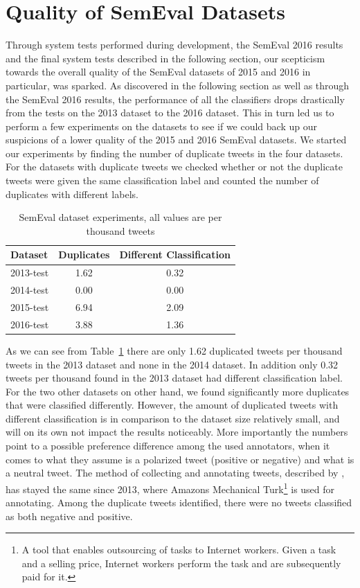 \section{Quality of SemEval Datasets}
\label{sec:criticism_semeval}
Through system tests performed during development, the SemEval 2016 results and the final system tests described in the following section, our scepticism towards the overall quality of the SemEval datasets of 2015 and 2016 in particular, was sparked. As discovered in the following section as well as through the SemEval 2016 results, the performance of all the classifiers drops drastically from the tests on the 2013 dataset to the 2016 dataset. This in turn led us to perform a few experiments on the datasets to see if we could back up our suspicions of a lower quality of the 2015 and 2016 SemEval datasets. We started our experiments by finding the number of duplicate tweets in the four datasets. For the datasets with duplicate tweets we checked whether or not the duplicate tweets were given the same classification label and counted the number of duplicates with different labels. \\

\begin{table}[t]
    \centering
    \begin{tabular}{|l|c|c|}
        \hline
        \textbf{Dataset} & \textbf{Duplicates} & \textbf{Different Classification}\\ \hline
        2013-test & 1.62 & 0.32 \\ \hline
        2014-test & 0.00 & 0.00 \\ \hline
        2015-test & 6.94 & 2.09 \\ \hline
        2016-test & 3.88 & 1.36 \\ \hline
    \end{tabular}
    \caption[SemEval dataset experiments]{SemEval dataset experiments, all values are per thousand tweets}
    \label{tab:dataset_experiments}   
\end{table}

As we can see from Table~\ref{tab:dataset_experiments} there are only 1.62 duplicated tweets per thousand tweets in the 2013 dataset and none in the 2014 dataset. In addition only 0.32 tweets per thousand found in the 2013 dataset had different classification label. For the two other datasets on other hand, we found significantly more duplicates that were classified differently. However, the amount of duplicated tweets with different classification is in comparison to the dataset size relatively small, and will on its own not impact the results noticeably. More importantly the numbers point to a possible preference difference among the used annotators, when it comes to what they assume is a polarized tweet (positive or negative) and what is a neutral tweet. The method of collecting and annotating tweets, described by \cite{SemEval:2016:task4}, has stayed the same since 2013, where Amazons Mechanical Turk\footnote{A tool that enables outsourcing of tasks to Internet workers. Given a task and a selling price, Internet workers perform the task and are subsequently paid for it.} is used for annotating. Among the duplicate tweets identified, there were no tweets classified as both negative and positive. 


